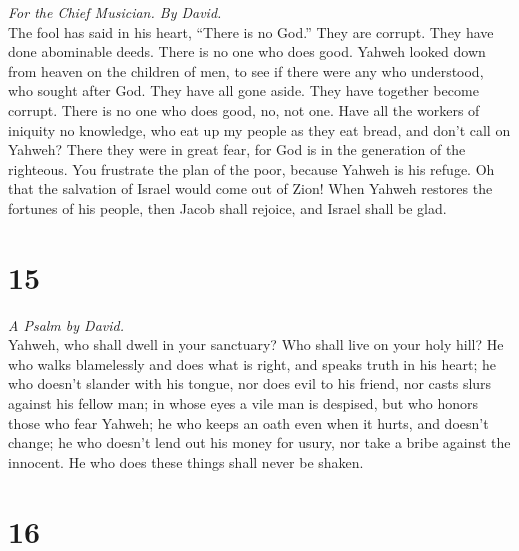 \emph{For the Chief Musician. By David.}\\
 The fool has said in his heart, ``There is no God.'' They
are corrupt. They have done abominable deeds. There is no one who does
good.  Yahweh looked down from heaven on the children of
men, to see if there were any who understood, who sought after God.
 They have all gone aside. They have together become
corrupt. There is no one who does good, no, not one.  Have
all the workers of iniquity no knowledge, who eat up my people as they
eat bread, and don't call on Yahweh?  There they were in
great fear, for God is in the generation of the righteous.
 You frustrate the plan of the poor, because Yahweh is his
refuge.  Oh that the salvation of Israel would come out of
Zion! When Yahweh restores the fortunes of his people, then Jacob shall
rejoice, and Israel shall be glad.

\hypertarget{section-14}{%
\section{15}\label{section-14}}

\emph{A Psalm by David.}\\
 Yahweh, who shall dwell in your sanctuary? Who shall live
on your holy hill?  He who walks blamelessly and does what
is right, and speaks truth in his heart;  he who doesn't
slander with his tongue, nor does evil to his friend, nor casts slurs
against his fellow man;  in whose eyes a vile man is
despised, but who honors those who fear Yahweh; he who keeps an oath
even when it hurts, and doesn't change;  he who doesn't
lend out his money for usury, nor take a bribe against the innocent. He
who does these things shall never be shaken.

\hypertarget{section-15}{%
\section{16}\label{section-15}}

